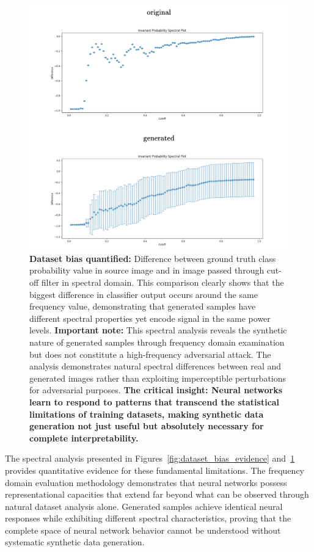 \begin{figure}[h]
\centering
\includegraphics[width=\linewidth]{figures/main/spectral_analysis_2.png}
\caption{\textbf{Dataset bias quantified:} Difference between ground truth class probability value in source image and in image passed through cut-off filter in spectral domain. This comparison clearly shows that the biggest difference in classifier output occurs around the same frequency value, demonstrating that generated samples have different spectral properties yet encode signal in the same power levels. \textbf{Important note:} This spectral analysis reveals the synthetic nature of generated samples through frequency domain examination but does not constitute a high-frequency adversarial attack. The analysis demonstrates natural spectral differences between real and generated images rather than exploiting imperceptible perturbations for adversarial purposes. \textbf{The critical insight: Neural networks learn to respond to patterns that transcend the statistical limitations of training datasets, making synthetic data generation not just useful but absolutely necessary for complete interpretability.}}
\label{fig:spectral_bias_analysis}
\end{figure}


The spectral analysis presented in Figures~\ref{fig:dataset_bias_evidence} and~\ref{fig:spectral_bias_analysis} provides quantitative evidence for these fundamental limitations. The frequency domain evaluation methodology demonstrates that neural networks possess representational capacities that extend far beyond what can be observed through natural dataset analysis alone. Generated samples achieve identical neural responses while exhibiting different spectral characteristics, proving that the complete space of neural network behavior cannot be understood without systematic synthetic data generation.

